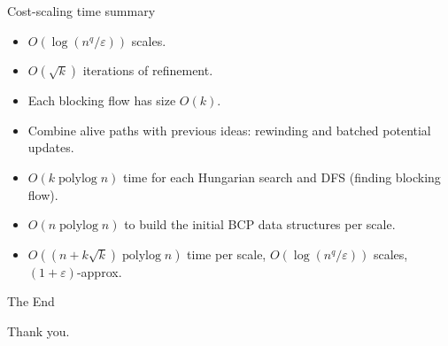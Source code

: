 \documentclass[xcolor={dvipsnames,usenames}]{beamer}
\newcommand{\eps}{\varepsilon}
\DeclareMathOperator{\polylog}{polylog}
\begin{document}
\begin{frame}{Cost-scaling time summary}
\begin{itemize}
\item $O(\log(n^q/\eps))$ scales.
\item $O(\sqrt{k})$ iterations of refinement.
\item Each blocking flow has size $O(k)$.
\vspace{10pt}
\pause
\item Combine alive paths with previous ideas: rewinding and batched potential updates.
\pause
\item $O(k\polylog n)$ time for each Hungarian search and DFS (finding blocking flow).
\pause
\item $O(n\polylog n)$ to build the initial BCP data structures per scale.
\vspace{10pt}
\pause
\item $O((n+k\sqrt{k})\polylog n)$ time per scale, $O(\log(n^q/\eps))$ scales, $(1+\eps)$-approx.
\end{itemize}
\end{frame}

\begin{frame}{The End}
\begin{center}
	Thank you.
\end{center}
\end{frame}







%
%
\end{document}
